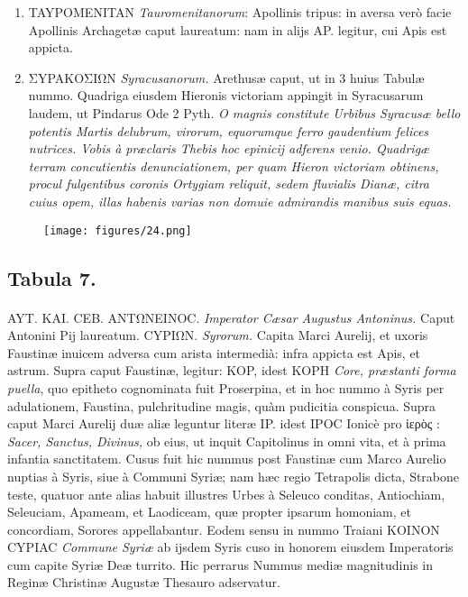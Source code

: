 \documentclass[a4paper, 11pt, oneside, polutonikogreek, latin]{article}
\begin{document}
\begin{enumerate}
    \item TAYPOMENITAN \emph{Tauromenitanorum}: Apollinis tripus: in aversa verò facie Apollinis Archagetæ caput laureatum: nam in alijs AP. legitur, cui Apis est appicta.

    \item ΣYPAKOΣIΩN \emph{Syracusanorum.} Arethusæ caput, ut in 3 huius Tabulæ nummo. Quadriga eiusdem Hieronis victoriam appingit in Syracusarum laudem, ut Pindarus Ode 2 Pyth. \emph{O magnis constitute Urbibus Syracusæ bello potentis Martis delubrum, virorum, equorumque ferro gaudentium felices nutrices. Vobis à præclaris Thebis hoc epinicij adferens venio. Quadrigæ terram concutientis denunciationem, per quam Hieron victoriam obtinens, procul fulgentibus coronis Ortygiam reliquit, sedem fluvialis Dianæ, citra cuius opem, illas habenis varias non domuie admirandis manibus suis equas.}
\end{enumerate}
\clearpage
\vspace*{\fill}
\begin{figure}[H]
\centering
\texttt{[image: figures/24.png]}
\end{figure}
\vspace*{\fill}
\clearpage
\subsection*{Tabula 7.}
\paragraph{}
AYT. KAI. CEB. ANTΩNEINOC. \emph{Imperator Cæsar Augustus Antoninus.} Caput Antonini Pij laureatum. CYPIΩN. \emph{Syrorum.} Capita Marci Aurelij, et uxoris Faustinæ inuicem adversa cum arista intermedià: infra appicta est Apis, et astrum. Supra caput Faustinæ, legitur: KOP, idest KOPH \emph{Core, præstanti forma puella}, quo epitheto cognominata fuit Proserpina, et in hoc nummo à Syris per adulationem, Faustina, pulchritudine magis, quàm pudicitia conspicua. Supra caput Marci Aurelij duæ aliæ leguntur literæ IP. idest IPOC Ionicè pro ἱερὸς : \emph{Sacer, Sanctus, Divinus,} ob eius, ut inquit Capitolinus in omni vita, et à prima infantia sanctitatem. Cusus fuit hic nummus post Faustinæ cum Marco Aurelio nuptias à Syris, siue à Communi Syriæ; nam hæc regio Tetrapolis dicta, Strabone teste, quatuor ante alias habuit illustres Urbes à Seleuco conditas, Antiochiam, Seleuciam, Apameam, et Laodiceam, quæ propter ipsarum homoniam, et concordiam, Sorores appellabantur. Eodem sensu in nummo Traiani KOINON CYPIAC \emph{Commune Syriæ} ab ijsdem Syris cuso in honorem eiusdem Imperatoris cum capite Syriæ Deæ turrito. Hic perrarus Nummus mediæ magnitudinis in Reginæ Christinæ Augustæ Thesauro adservatur.
\end{document}
